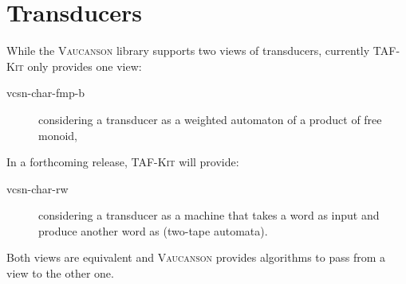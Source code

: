 \documentclass[a4paper]{report}
\newcommand\var[1]{{\ttfamily\itshape #1}}
\newcommand\samp[1]{`\texttt{#1}'}
\newcommand\option[1]{`\texttt{#1}'}
\newcommand{\tafkit}{\textsc{TAF-Kit}\xspace}
\newcommand{\Vauc}{\textsc{Vaucanson}\xspace}
\newenvironment{fnsection}[1]{%
  \renewcommand{\item}[3]{\texttt{##1} \var{##2} & ##3\\}

  \tabularx{\textwidth}{|l|X|}%
    \hline\multicolumn{2}{|c|}{#1} \\\hline%
  }{%
  \endtabularx%
}
\begin{document}

\newpage
\section{Transducers}
\label{sec:vcsn-char-fmp-b}

While the \Vauc library supports two views of transducers, currently
\tafkit only provides one view:

\begin{description}
\item[vcsn-char-fmp-b] considering a transducer as a weighted automaton of a
  product of free monoid,
\end{description}

In a forthcoming release, \tafkit will provide:

\begin{description}
\item[vcsn-char-rw] considering a transducer as a machine that takes a
  word as input and produce another word as (two-tape automata).
\end{description}

Both views are equivalent and \Vauc provides algorithms to pass from a
view to the other one.
\end{document}
